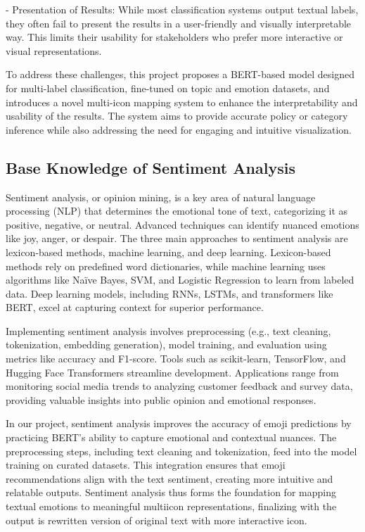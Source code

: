 \documentclass{article}
\begin{document}
- Presentation of Results: While most classification systems output textual labels, they often fail to present the results in a user-friendly and visually interpretable way. This limits their usability for stakeholders who prefer more interactive or visual representations.

To address these challenges, this project proposes a BERT-based model designed for multi-label classification, fine-tuned on topic and emotion datasets, and introduces a novel multi-icon mapping system to enhance the interpretability and usability of the results. The system aims to provide accurate policy or category inference while also addressing the need for engaging and intuitive visualization.
\subsection{Base Knowledge of Sentiment Analysis}
Sentiment analysis, or opinion mining, is a key area of natural language processing (NLP) that determines the emotional tone of text, categorizing it as positive, negative, or neutral. Advanced techniques can identify nuanced emotions like joy, anger, or despair. The three main approaches to sentiment analysis are lexicon-based methods, machine learning, and deep learning. Lexicon-based methods rely on predefined word dictionaries, while machine learning uses algorithms like Naïve Bayes, SVM, and Logistic Regression to learn from labeled data. Deep learning models, including RNNs, LSTMs, and transformers like BERT, excel at capturing context for superior performance.

Implementing sentiment analysis involves preprocessing (e.g., text cleaning, tokenization, embedding generation), model training, and evaluation using metrics like accuracy and F1-score. Tools such as scikit-learn, TensorFlow, and Hugging Face Transformers streamline development. Applications range from monitoring social media trends to analyzing customer feedback and survey data, providing valuable insights into public opinion and emotional responses.

In our project, sentiment analysis improves the accuracy of emoji predictions by practicing BERT’s ability to capture emotional and contextual nuances. The preprocessing steps, including text cleaning and tokenization, feed into the model training on curated datasets. This integration ensures that emoji recommendations align with the text sentiment, creating more intuitive and relatable outputs. Sentiment analysis thus forms the foundation for mapping textual emotions to meaningful multiicon representations, finalizing with the output is rewritten version of original text with more interactive icon.
\end{document}
